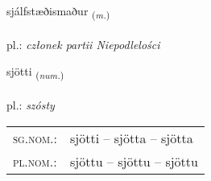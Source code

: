 \documentclass[frontgrid, backgrid]{flacards}\usepackage[]{graphicx}\usepackage[]{xcolor}
\begin{document}
\renewcommand{\flhead}{\vskip5pt \fboxsep=0pt {\small\bfseries\footnotesize Nafnorð | rzeczownik}}
\renewcommand{\fcfoot}{\vskip5pt \fboxsep=0pt \hspace{2pt}{\small\bfseries\footnotesize 3K}}

\renewcommand{\blhead}{\vskip5pt {\small\bfseries\footnotesize Nafnorð | rzeczownik }}
\renewcommand{\bcfoot}{\vskip5pt \hspace{2pt}{\small\bfseries\footnotesize 3K}}


{sjálfstæðismaður \small{\textsubscript{(\textit{m.})}} \\[1ex] %
\textphonetic{[sjaulfstaiðɪsmaðʏr]} \\
pl.: \emph{członek partii Niepodlelości} \\  [2ex]
\renewcommand*{\arraystretch}{0.8}
}

\renewcommand{\flhead}{\vskip5pt \fboxsep=0pt {\small\bfseries\footnotesize Töluorð | liczebnik}}
\renewcommand{\fcfoot}{\vskip5pt \fboxsep=0pt \hspace{2pt}{\small\bfseries\footnotesize 3K}}

\renewcommand{\blhead}{\vskip5pt {\small\bfseries\footnotesize Töluorð | liczebnik }}
\renewcommand{\bcfoot}{\vskip5pt \hspace{2pt}{\small\bfseries\footnotesize 3K}}


{sjötti \small{\textsubscript{(\textit{num.})}} \\[1ex] %
\textphonetic{[sjœhtɪ]} \\
pl.: \emph{szósty} \\  [2ex]
\renewcommand*{\arraystretch}{0.8}
\begin{tabular}{ll}
\textsc{sg.nom.}: & sjötti  --  sjötta -- sjötta \\ 
\textsc{pl.nom.}: & sjöttu -- sjöttu -- sjöttu
\end{tabular}
}
\end{document}
